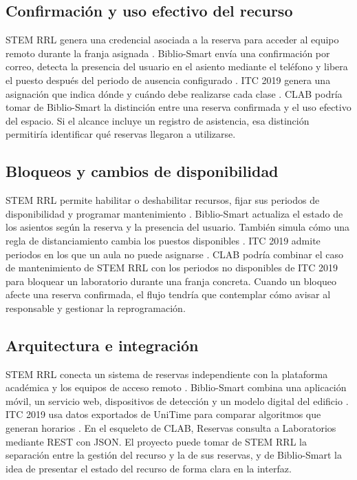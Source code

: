 {  \subsection{Confirmación y uso efectivo del recurso}

  STEM RRL genera una credencial asociada a la reserva para acceder al equipo
  remoto durante la franja asignada \cite{gilVera2024}. Biblio-Smart envía una
  confirmación por correo, detecta la presencia del usuario en el asiento
  mediante el teléfono y libera el puesto después del periodo de ausencia
  configurado \cite{garciaGranja2022}. ITC 2019 genera una asignación que indica
  dónde y cuándo debe realizarse cada clase \cite{muller2025}. CLAB podría
  tomar de Biblio-Smart la distinción entre una reserva confirmada y el uso
  efectivo del espacio. Si el alcance incluye un registro de asistencia, esa
  distinción permitiría identificar qué reservas llegaron a utilizarse.

  \subsection{Bloqueos y cambios de disponibilidad}

  STEM RRL permite habilitar o deshabilitar recursos, fijar sus periodos de
  disponibilidad y programar mantenimiento \cite{gilVera2024}. Biblio-Smart
  actualiza el estado de los asientos según la reserva y la presencia del
  usuario. También simula cómo una regla de distanciamiento cambia los
  puestos disponibles \cite{garciaGranja2022}. ITC 2019 admite periodos en
  los que un aula no puede asignarse \cite{muller2025}. CLAB podría combinar
  el caso de mantenimiento de STEM RRL con los periodos no disponibles de
  ITC 2019 para bloquear un laboratorio durante una franja concreta. Cuando
  un bloqueo afecte una reserva confirmada, el flujo tendría que contemplar
  cómo avisar al responsable y gestionar la reprogramación.

  \subsection{Arquitectura e integración}

  STEM RRL conecta un sistema de reservas independiente con la plataforma
  académica y los equipos de acceso remoto \cite{gilVera2024}. Biblio-Smart
  combina una aplicación móvil, un servicio web, dispositivos de detección
  y un modelo digital del edificio \cite{garciaGranja2022}. ITC 2019 usa
  datos exportados de UniTime para comparar algoritmos que generan horarios
  \cite{muller2025}. En el esqueleto de CLAB, Reservas consulta a
  Laboratorios mediante REST con JSON. El proyecto puede tomar de STEM RRL
  la separación entre la gestión del recurso y la de sus reservas, y de
  Biblio-Smart la idea de presentar el estado del recurso de forma clara
  en la interfaz.

}
